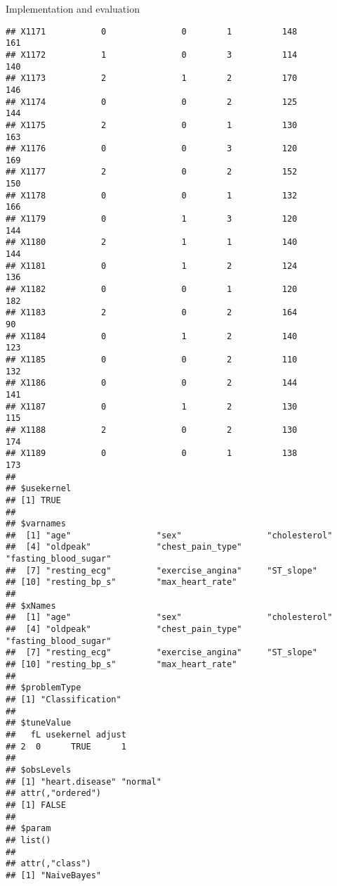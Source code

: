 \documentclass[
  ignorenonframetext,
]{beamer}
\begin{document}
\begin{frame}[fragile]{Implementation and evaluation}
\begin{verbatim}
## X1171           0               0        1          148            161
## X1172           1               0        3          114            140
## X1173           2               1        2          170            146
## X1174           0               0        2          125            144
## X1175           2               0        1          130            163
## X1176           0               0        3          120            169
## X1177           2               0        2          152            150
## X1178           0               0        1          132            166
## X1179           0               1        3          120            144
## X1180           2               1        1          140            144
## X1181           0               1        2          124            136
## X1182           0               0        1          120            182
## X1183           2               0        2          164             90
## X1184           0               1        2          140            123
## X1185           0               0        2          110            132
## X1186           0               0        2          144            141
## X1187           0               1        2          130            115
## X1188           2               0        2          130            174
## X1189           0               0        1          138            173
## 
## $usekernel
## [1] TRUE
## 
## $varnames
##  [1] "age"                 "sex"                 "cholesterol"        
##  [4] "oldpeak"             "chest_pain_type"     "fasting_blood_sugar"
##  [7] "resting_ecg"         "exercise_angina"     "ST_slope"           
## [10] "resting_bp_s"        "max_heart_rate"     
## 
## $xNames
##  [1] "age"                 "sex"                 "cholesterol"        
##  [4] "oldpeak"             "chest_pain_type"     "fasting_blood_sugar"
##  [7] "resting_ecg"         "exercise_angina"     "ST_slope"           
## [10] "resting_bp_s"        "max_heart_rate"     
## 
## $problemType
## [1] "Classification"
## 
## $tuneValue
##   fL usekernel adjust
## 2  0      TRUE      1
## 
## $obsLevels
## [1] "heart.disease" "normal"       
## attr(,"ordered")
## [1] FALSE
## 
## $param
## list()
## 
## attr(,"class")
## [1] "NaiveBayes"
\end{verbatim}


\end{frame}
\end{document}
